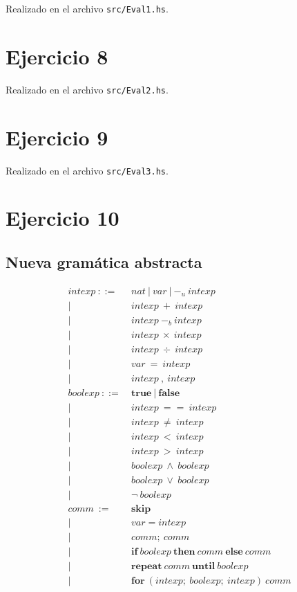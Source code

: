 \documentclass[11pt]{article}
\begin{document}
Realizado en el archivo \verb|src/Eval1.hs|.

\section*{Ejercicio 8}

Realizado en el archivo \verb|src/Eval2.hs|.

\section*{Ejercicio 9}

Realizado en el archivo \verb|src/Eval3.hs|.

\section*{Ejercicio 10}

\subsection*{Nueva gram\'atica abstracta}
\begin{align*}
    intexp\ ::=\ & nat\ |\ var\ |\ -_u\ intexp \\
            |\ \ & intexp\ +\ intexp \\ 
            |\ \ & intexp\ -_b\ intexp \\ 
            |\ \ & intexp\ \times\ intexp \\ 
            |\ \ & intexp\ \div\ intexp \\ 
            |\ \ & var\ =\ intexp \\
            |\ \ & intexp\ ,\ intexp \\
    boolexp\ ::=\ & \textbf{true}\ |\ \textbf{false} \\
             |\ \ & intexp\ ==\ intexp \\
             |\ \ & intexp\ \ne\ intexp \\
             |\ \ & intexp\ <\ intexp \\
             |\ \ & intexp\ >\ intexp \\
             |\ \ & boolexp\ \wedge\ boolexp \\
             |\ \ & boolexp\ \vee\ boolexp \\
             |\ \ & \neg\ boolexp \\
    comm\ :=\ & \textbf{skip} \\
          |\ \ & var = intexp \\
          |\ \ & comm;\ comm \\
          |\ \ & \textbf{if}\ boolexp\ \textbf{then}\ comm\ \textbf{else}\ comm \\
          |\ \ & \textbf{repeat}\ comm\ \textbf{until}\ boolexp \\
          |\ \ & \textbf{for}\ (intexp;\ boolexp;\ intexp) \ comm 
\end{align*}
\end{document}
